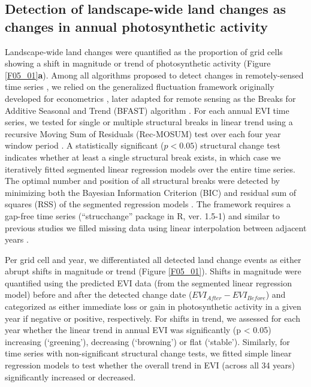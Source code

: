 \subsection{Detection of landscape-wide land changes as changes in annual photosynthetic activity}
\label{C05_0203}

Landscape-wide land changes were quantified as the proportion of grid cells showing a shift in magnitude or trend of photosynthetic activity (Figure \ref{F05_01}\textbf{a}). Among all algorithms proposed to detect changes in remotely-sensed time series \citep{Zhu2017}, we relied on the generalized fluctuation framework originally developed for econometrics \citep{Bai2003,Zeileis2005}, later adapted for remote sensing as the Breaks for Additive Seasonal and Trend (BFAST) algorithm \citep{Verbesselt2010}. For each annual EVI time series, we tested for single or multiple structural breaks in linear trend using a recursive Moving Sum of Residuals (Rec-MOSUM) test over each four year window period \citep{Zeileis2005}. A statistically significant ($p < 0.05$) structural change test indicates whether at least a single structural break exists, in which case we iteratively fitted segmented linear regression models over the entire time series. The optimal number and position of all structural breaks were detected by minimizing both the Bayesian Information Criterion (BIC) and residual sum of squares (RSS) of the segmented regression models \citep{Zeileis2005,Verbesselt2010}. The framework requires a gap-free time series (“strucchange” package in R, ver. 1.5-1) and similar to previous studies we filled missing data using linear interpolation between adjacent years \citep{Verbesselt2010}.

Per grid cell and year, we differentiated all detected land change events as either abrupt shifts in magnitude or trend (Figure \ref{F05_01}). Shifts in magnitude were quantified using the predicted EVI data (from the segmented linear regression model) before and after the detected change date ($EVI_{After} - EVI_{Before}$) and categorized as either immediate loss or gain in photosynthetic activity in a given year if negative or positive, respectively. For shifts in trend, we assessed for each year whether the linear trend in annual EVI was significantly (p < 0.05) increasing (‘greening’), decreasing (‘browning’) or flat (‘stable’). Similarly, for time series with non-significant structural change tests, we fitted simple linear regression models to test whether the overall trend in EVI (across all 34 years) significantly increased or decreased.

